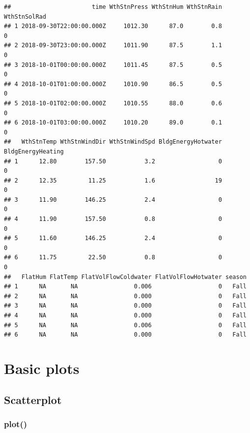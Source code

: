 \documentclass[
]{book}
\newenvironment{Shaded}{\begin{snugshade}}{\end{snugshade}}
\newcommand{\CommentTok}[1]{\textcolor[rgb]{0.56,0.35,0.01}{\textit{#1}}}
\newcommand{\DataTypeTok}[1]{\textcolor[rgb]{0.13,0.29,0.53}{#1}}
\newcommand{\KeywordTok}[1]{\textcolor[rgb]{0.13,0.29,0.53}{\textbf{#1}}}
\newcommand{\NormalTok}[1]{#1}
\newcommand{\OperatorTok}[1]{\textcolor[rgb]{0.81,0.36,0.00}{\textbf{#1}}}
\newcommand{\OtherTok}[1]{\textcolor[rgb]{0.56,0.35,0.01}{#1}}
\newcommand{\StringTok}[1]{\textcolor[rgb]{0.31,0.60,0.02}{#1}}
\begin{document}
\begin{verbatim}
##                       time WthStnPress WthStnHum WthStnRain WthStnSolRad
## 1 2018-09-30T22:00:00.000Z     1012.30      87.0        0.8            0
## 2 2018-09-30T23:00:00.000Z     1011.90      87.5        1.1            0
## 3 2018-10-01T00:00:00.000Z     1011.45      87.5        0.5            0
## 4 2018-10-01T01:00:00.000Z     1010.90      86.5        0.5            0
## 5 2018-10-01T02:00:00.000Z     1010.55      88.0        0.6            0
## 6 2018-10-01T03:00:00.000Z     1010.20      89.0        0.1            0
##   WthStnTemp WthStnWindDir WthStnWindSpd BldgEnergyHotwater BldgEnergyHeating
## 1      12.80        157.50           3.2                  0                 0
## 2      12.35         11.25           1.6                 19                 0
## 3      11.90        146.25           2.4                  0                 0
## 4      11.90        157.50           0.8                  0                 0
## 5      11.60        146.25           2.4                  0                 0
## 6      11.75         22.50           0.8                  0                 0
##   FlatHum FlatTemp FlatVolFlowColdwater FlatVolFlowHotwater season
## 1      NA       NA                0.006                   0   Fall
## 2      NA       NA                0.000                   0   Fall
## 3      NA       NA                0.000                   0   Fall
## 4      NA       NA                0.000                   0   Fall
## 5      NA       NA                0.006                   0   Fall
## 6      NA       NA                0.000                   0   Fall
\end{verbatim}

\hypertarget{basic-plots}{%
\section{Basic plots}\label{basic-plots}}

\hypertarget{scatterplot}{%
\subsection{Scatterplot}\label{scatterplot}}

\hypertarget{plot}{%
\subsubsection{plot()}\label{plot}}

\begin{Shaded}
\end{Shaded}
\end{document}
